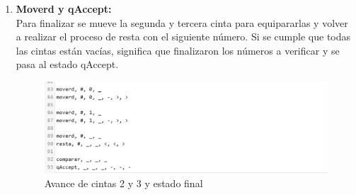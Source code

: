 \documentclass[12pt]{article}
\begin{document}
\begin{enumerate}
\newpage
\item \textbf{Moverd y qAccept:}\\

Para finalizar se mueve la segunda y tercera cinta para equipararlas y volver a realizar el proceso de resta con el siguiente número. Si se cumple que todas las cintas están vacías, significa que finalizaron los números a verificar y se pasa al estado qAccept.

\begin{figure}[h]
    \centering
    \includegraphics[width=\textwidth]{fotos/Screenshot 2021-11-27 182052}
    \caption{Avance de cintas 2 y 3 y estado final}
\end{figure}

\end{enumerate}
\end{document}
